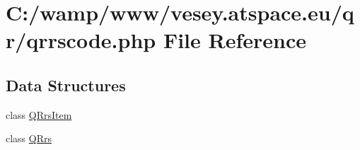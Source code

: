 \hypertarget{qrrscode_8php}{\section{C\-:/wamp/www/vesey.atspace.\-eu/qr/qrrscode.php File Reference}
\label{qrrscode_8php}
}
\subsection*{Data Structures}
\begin{DoxyCompactItemize}
\item 
class \hyperlink{class_q_rrs_item}{Q\-Rrs\-Item}
\item 
class \hyperlink{class_q_rrs}{Q\-Rrs}
\end{DoxyCompactItemize}

